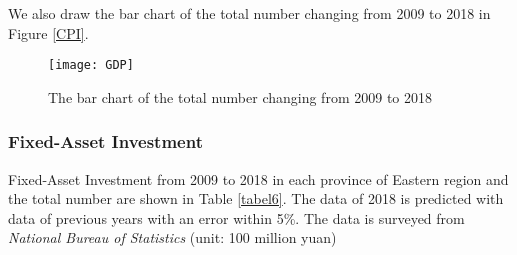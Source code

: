 \documentclass{apmcmthesis}
\begin{document}
We also draw the bar chart of the total number changing from 2009 to 2018 in Figure \ref{CPI}.
\begin{figure}[h]
  \centering
  \texttt{[image: GDP]}
  \caption{The bar chart of the total number changing from 2009 to 2018}\label{GDP}
\end{figure}


\subsubsection{Fixed-Asset Investment}
\hspace{2em}Fixed-Asset Investment from 2009 to 2018 in each province of Eastern region and the total number are shown in Table \ref{tabel6}. The data of 2018 is predicted with data of previous years with an error within 5\%. The data is surveyed from \textit{National Bureau of Statistics} (unit: 100 million yuan)
\end{document}
